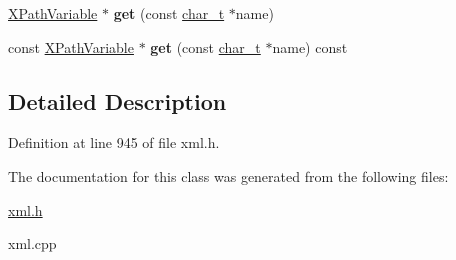 \begin{DoxyCompactItemize}
\item 
\hypertarget{classphys_1_1xml_1_1XPathVariableSet_a6c7429a3e50c1980a7fcdcee8af66834}{
\hyperlink{classphys_1_1xml_1_1XPathVariable}{XPathVariable} $\ast$ {\bfseries get} (const \hyperlink{namespacephys_1_1xml_afc87705cd1c2917d87b879715a2d8f6e}{char\_\-t} $\ast$name)}
\label{df/dd1/classphys_1_1xml_1_1XPathVariableSet_a6c7429a3e50c1980a7fcdcee8af66834}

\item 
\hypertarget{classphys_1_1xml_1_1XPathVariableSet_a3990eb85bebe88a7d4892eac19d4aa1b}{
const \hyperlink{classphys_1_1xml_1_1XPathVariable}{XPathVariable} $\ast$ {\bfseries get} (const \hyperlink{namespacephys_1_1xml_afc87705cd1c2917d87b879715a2d8f6e}{char\_\-t} $\ast$name) const }
\label{df/dd1/classphys_1_1xml_1_1XPathVariableSet_a3990eb85bebe88a7d4892eac19d4aa1b}

\end{DoxyCompactItemize}


\subsection{Detailed Description}


Definition at line 945 of file xml.h.



The documentation for this class was generated from the following files:\begin{DoxyCompactItemize}
\item 
\hyperlink{xml_8h}{xml.h}\item 
xml.cpp\end{DoxyCompactItemize}
